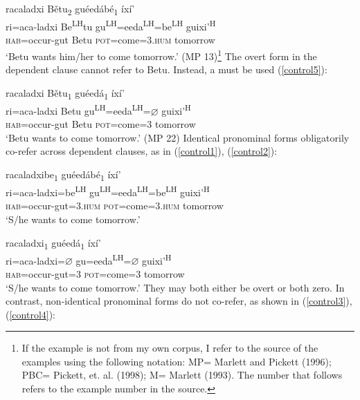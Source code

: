 \ea\label{control6}
\glll racaladxi B\v{e}tu\textsubscript{2} gu\'{e}ed\'{a}b\'{e}\textsubscript{1} \'{i}x\'{i}' \\
ri=aca-ladxi Be\textsuperscript{LH}tu gu\textsuperscript{LH}=eeda\textsuperscript{LH}=be\textsuperscript{LH}  guixi'\textsuperscript{H}  \\
\textsc{hab}=occur-gut Betu \textsc{pot}=come=\textsc{3.hum} tomorrow \\
\glt `Betu wants him/her to come tomorrow.'  \hfill{(MP 13)}\footnote{If the example is not from my own corpus, I refer to the source of the examples using the following notation: MP= Marlett and Pickett (1996); PBC= Pickett, et. al. (1998); M= Marlett (1993). The number that follows refers to the example number in the source.}
\z
The overt form in the dependent clause cannot refer to Betu. Instead, a  must be used (\ref{control5}):

\ea\label{control5}
\glll racaladxi B\v{e}tu\textsubscript{1} gu\'{e}ed\'{a}\textsubscript{1} \'{i}x\'{i}' \\
ri=aca-ladxi Betu gu\textsuperscript{LH}=eeda\textsuperscript{LH}={$\varnothing$} guixi'\textsuperscript{H}  \\
\textsc{hab}=occur-gut Betu \textsc{pot}=come=\textsc{3} tomorrow \\
\glt `Betu wants to come tomorrow.' \hfill{(MP 22)}
\z
Identical pronominal forms obligatorily co-refer across dependent clauses, as in (\ref{control1}), (\ref{control2}):

\ea\label{control1}
\glll racaladxibe\textsubscript{1} gu\'{e}ed\'{a}b\'{e}\textsubscript{1} \'{i}x\'{i}' \\
ri=aca-ladxi=be\textsuperscript{LH}  gu\textsuperscript{LH}=eeda\textsuperscript{LH}=be\textsuperscript{LH}  guixi'\textsuperscript{H}  \\
\textsc{hab}=occur-gut=\textsc{3.hum} \textsc{pot}=come=\textsc{3.hum} tomorrow \\
\glt `S/he wants to come tomorrow.'
\z

\ea\label{control2}
\glll racaladxi\textsubscript{1} gu\'{e}ed\'{a}\textsubscript{1} \'{i}x\'{i}' \\
ri=aca-ladxi={$\varnothing$} gu=eeda\textsuperscript{LH}={$\varnothing$} guixi'\textsuperscript{H}  \\
\textsc{hab}=occur-gut=\textsc{3} \textsc{pot}=come=\textsc{3} tomorrow \\
\glt `S/he wants to come tomorrow.'
\z
They may both either be overt or both zero. In contrast, non-identical pronominal forms do not co-refer, as shown in (\ref{control3}), (\ref{control4}):

